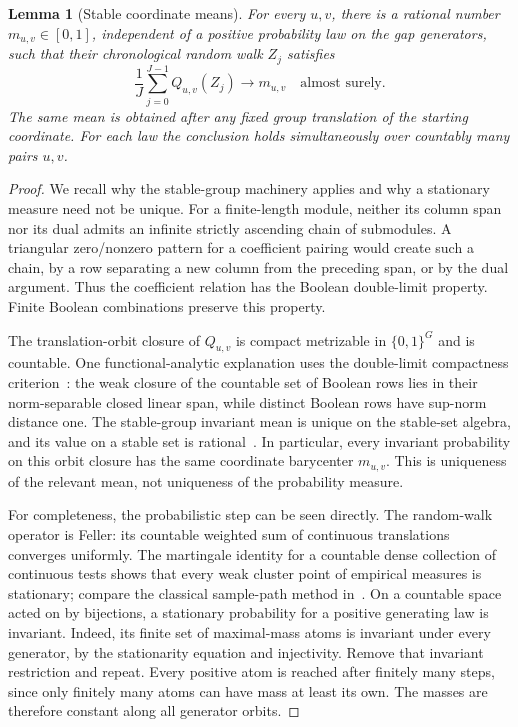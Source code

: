 \documentclass[11pt]{article}
\newtheorem{lemma}[theorem]{Lemma}
\theoremstyle{definition}
\theoremstyle{remark}
\begin{document}
\begin{lemma}[Stable coordinate means]\label{lem:means}
For every $u,v$, there is a rational number $m_{u,v}\in[0,1]$, independent of a positive probability law on the gap generators, such that their chronological random walk $Z_j$ satisfies
\[
 \frac1J\sum_{j=0}^{J-1}Q_{u,v}(Z_j)\longrightarrow m_{u,v}
 \quad\text{almost surely}.
\]
The same mean is obtained after any fixed group translation of the starting coordinate. For each law the conclusion holds simultaneously over countably many pairs $u,v$.
\end{lemma}
\begin{proof}
We recall why the stable-group machinery applies and why a stationary measure need not be unique. For a finite-length module, neither its column span nor its dual admits an infinite strictly ascending chain of submodules. A triangular zero/nonzero pattern for a coefficient pairing would create such a chain, by a row separating a new column from the preceding span, or by the dual argument. Thus the coefficient relation has the Boolean double-limit property. Finite Boolean combinations preserve this property.

The translation-orbit closure of $Q_{u,v}$ is compact metrizable in $\{0,1\}^G$ and is countable. One functional-analytic explanation uses the double-limit compactness criterion~\cite{Grothendieck1952}: the weak closure of the countable set of Boolean rows lies in their norm-separable closed linear span, while distinct Boolean rows have sup-norm distance one. The stable-group invariant mean is unique on the stable-set algebra, and its value on a stable set is rational~\cite[Corollary 4.15]{Conant2021Stability}. In particular, every invariant probability on this orbit closure has the same coordinate barycenter $m_{u,v}$. This is uniqueness of the relevant mean, not uniqueness of the probability measure.

For completeness, the probabilistic step can be seen directly. The random-walk operator is Feller: its countable weighted sum of continuous translations converges uniformly. The martingale identity for a countable dense collection of continuous tests shows that every weak cluster point of empirical measures is stationary; compare the classical sample-path method in~\cite{JamisonSine1974Sample}. On a countable space acted on by bijections, a stationary probability for a positive generating law is invariant. Indeed, its finite set of maximal-mass atoms is invariant under every generator, by the stationarity equation and injectivity. Remove that invariant restriction and repeat. Every positive atom is reached after finitely many steps, since only finitely many atoms can have mass at least its own. The masses are therefore constant along all generator orbits.


\end{proof}
\end{document}
